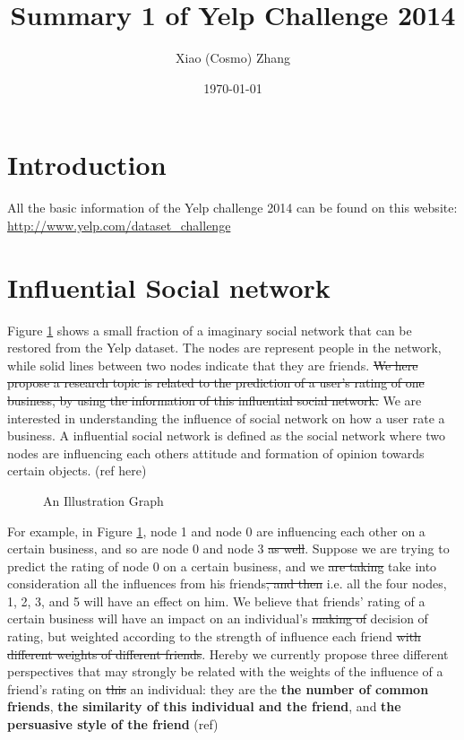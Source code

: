 \documentclass[11pt]{article} %
\title{Summary 1 of Yelp Challenge 2014}
\author{Xiao (Cosmo) Zhang}
\date{\today} %
\newcommand{\1}{{\bf 1}}
\newcommand{\0}{{\bf 0}}
\begin{document}
\maketitle
\tableofcontents

\newpage
\section{Introduction}
All the basic information of the Yelp challenge 2014 can be found on this website: \url{http://www.yelp.com/dataset_challenge}

\section{Influential Social network}
Figure \ref{grh} shows a small fraction of a imaginary social network that can be restored from the Yelp dataset. The nodes are represent people in the network, while solid lines between two nodes indicate that they are friends. \sout{We here propose a research topic is related to the prediction of a user's rating of one business, by using the information of this influential social network.} We are interested in understanding the influence of social network on how a user rate a business. A influential social network is defined as the social network where two nodes are influencing each others attitude and formation of opinion towards certain objects. (ref here)
\begin{figure}[htb!]
\centering
{}
\caption{An Illustration Graph}
\label{grh}	
\end{figure}

For example, in Figure \ref{grh}, node 1 and node 0 are influencing each other on a certain business, and so are node 0 and node 3 \sout{as well}. Suppose we are trying to predict the rating of node 0 on a certain business, and we \sout{are taking} take into consideration all the influences from his friends\sout{, and then} i.e. all the four nodes, 1, 2, 3, and 5 will have an effect on him. We believe that friends' rating of a certain business will have an impact on an individual's \sout{making of} decision of rating, but weighted according to the strength of influence each friend \sout{with different weights of different friends}. Hereby we currently propose three different perspectives that may strongly be related with the weights of the influence of a friend's rating on \sout{this} an individual: they are the \textbf{the number of common friends}, \textbf{the similarity of this individual and the friend}, and \textbf{the persuasive style of the friend} (ref)
\end{document}
